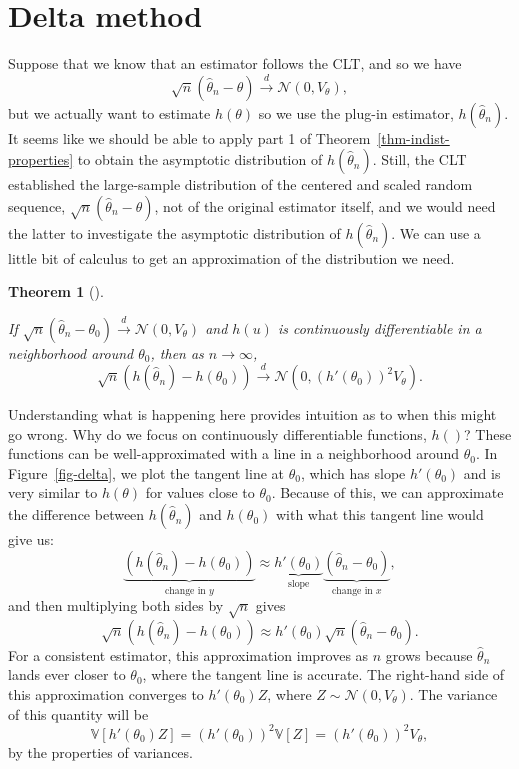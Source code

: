\documentclass[
  13pt,
  letterpaper,
  DIV=11,
  numbers=noendperiod]{scrreprt}
\newcommand{\V}{\mathbb{V}}
\newcommand{\N}{\mathcal{N}}
\newcommand{\indist}{\overset{d}{\to}}
\theoremstyle{plain}
\newtheorem{theorem}{Theorem}[chapter]
\theoremstyle{plain}
\theoremstyle{definition}
\theoremstyle{definition}
\theoremstyle{remark}
\begin{document}
\section{Delta method}\label{sec-delta-method}

Suppose that we know that an estimator follows the CLT, and so we have
\[
\sqrt{n}\left(\widehat{\theta}_n - \theta \right) \indist \N(0, V_{\theta}),
\] but we actually want to estimate \(h(\theta)\) so we use the plug-in
estimator, \(h(\widehat{\theta}_n)\). It seems like we should be able to
apply part 1 of Theorem~\ref{thm-indist-properties} to obtain the
asymptotic distribution of \(h(\widehat{\theta}_n)\). Still, the CLT
established the large-sample distribution of the centered and scaled
random sequence, \(\sqrt{n}(\widehat{\theta}_n - \theta)\), not of the
original estimator itself, and we would need the latter to investigate
the asymptotic distribution of \(h(\widehat{\theta}_n)\). We can use a
little bit of calculus to get an approximation of the distribution we
need.

\begin{theorem}[]\protect\hypertarget{thm-delta-method}{}\label{thm-delta-method}

If
\(\sqrt{n}\left(\widehat{\theta}_n - \theta_0\right) \indist \N(0, V_{\theta})\)
and \(h(u)\) is continuously differentiable in a neighborhood around
\(\theta_0\), then as \(n\to\infty\), \[
\sqrt{n}\left(h(\widehat{\theta}_n) - h(\theta_0) \right) \indist \N(0, (h'(\theta_0))^2 V_{\theta}).
\]

\end{theorem}

Understanding what is happening here provides intuition as to when this
might go wrong. Why do we focus on continuously differentiable
functions, \(h()\)? These functions can be well-approximated with a line
in a neighborhood around \(\theta_0\). In Figure~\ref{fig-delta}, we
plot the tangent line at \(\theta_0\), which has slope \(h'(\theta_0)\)
and is very similar to \(h(\theta)\) for values close to \(\theta_0\).
Because of this, we can approximate the difference between
\(h(\widehat{\theta}_n)\) and \(h(\theta_0)\) with what this tangent
line would give us: \[
\underbrace{\left(h(\widehat{\theta}_n) - h(\theta_0)\right)}_{\text{change in } y} \approx \underbrace{h'(\theta_0)}_{\text{slope}} \underbrace{\left(\widehat{\theta}_n - \theta_0\right)}_{\text{change in } x},
\] and then multiplying both sides by \(\sqrt{n}\) gives \[
\sqrt{n}\left(h(\widehat{\theta}_n) - h(\theta_0)\right) \approx h'(\theta_0)\sqrt{n}\left(\widehat{\theta}_n - \theta_0\right). 
\] For a consistent estimator, this approximation improves as \(n\)
grows because \(\widehat\theta_n\) lands ever closer to \(\theta_0\),
where the tangent line is accurate. The right-hand side of this
approximation converges to \(h'(\theta_0)Z\), where
\(Z \sim \N(0, V_{\theta})\). The variance of this quantity will be \[
\V[h'(\theta_0)Z] = (h'(\theta_0))^2\V[Z] = (h'(\theta_0))^2V_{\theta},
\] by the properties of variances.
\end{document}
